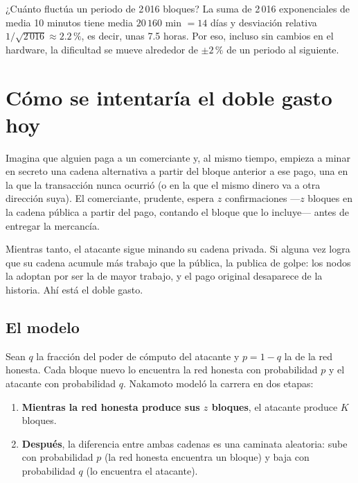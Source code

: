 \documentclass[11pt,a4paper]{article}
\newcommand{\webhint}[1]{}
\begin{document}
\begin{nota}{¿Cuánto fluctúa un periodo de 2\,016 bloques?}
La suma de 2\,016 exponenciales de media 10 minutos tiene media $20\,160$ min $=14$ días y desviación relativa $1/\sqrt{2\,016}\approx 2.2\,\%$, es decir, unas 7.5 horas. Por eso, incluso sin cambios en el hardware, la dificultad se mueve alrededor de $\pm 2\,\%$ de un periodo al siguiente.
\end{nota}

\section{Cómo se intentaría el doble gasto hoy}\label{sec:ataque}
\webhint{section; id=sec-ataque; slug=el-ataque-clasico; kicker=09 — el ataque clásico; role=narrative+math}

Imagina que alguien paga a un comerciante y, al mismo tiempo, empieza a minar en secreto una cadena alternativa a partir del bloque anterior a ese pago, una en la que la transacción nunca ocurrió (o en la que el mismo dinero va a otra dirección suya). El comerciante, prudente, espera $z$ confirmaciones ---$z$ bloques en la cadena pública a partir del pago, contando el bloque que lo incluye--- antes de entregar la mercancía.

Mientras tanto, el atacante sigue minando su cadena privada. Si alguna vez logra que su cadena acumule más trabajo que la pública, la publica de golpe: los nodos la adoptan por ser la de mayor trabajo, y el pago original desaparece de la historia. Ahí está el doble gasto.

\subsection{El modelo}

Sean $q$ la fracción del poder de cómputo del atacante y $p=1-q$ la de la red honesta. Cada bloque nuevo lo encuentra la red honesta con probabilidad $p$ y el atacante con probabilidad $q$. Nakamoto modeló la carrera en dos etapas:

\begin{enumerate}[leftmargin=1.6em,itemsep=2pt]
  \item \textbf{Mientras la red honesta produce sus $z$ bloques}, el atacante produce $K$ bloques.
  \item \textbf{Después}, la diferencia entre ambas cadenas es una caminata aleatoria: sube con probabilidad $p$ (la red honesta encuentra un bloque) y baja con probabilidad $q$ (lo encuentra el atacante).
\end{enumerate}
\end{document}
